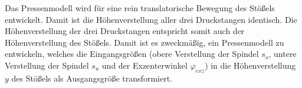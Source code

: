 Das Pressenmodell wird für eine rein translatorische Bewegung des Stößels entwickelt. Damit ist die Höhenverstellung aller drei Druckstangen identisch. Die Höhenverstellung der drei Druckstangen entspricht somit auch der Höhenverstellung des Stößels. 
Damit ist es zweckmäßig, ein Pressenmodell zu entwickeln, welches die Eingangsgrößen (obere Verstellung der Spindel $s_o$, untere Verstellung der Spindel $s_u$ und der Exzenterwinkel $\varphi_{exz}$) in die Höhenverstellung $y$ des Stößels als Ausgangsgröße transformiert. 





  
  
  
  
  
 
